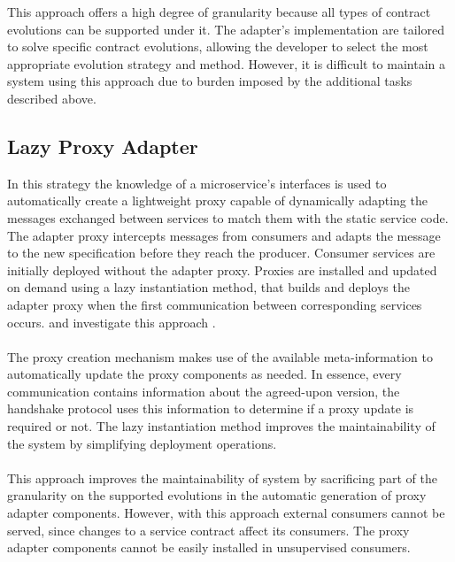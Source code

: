 This approach offers a high degree of granularity because all types of contract evolutions can be supported under it.
The adapter's implementation are tailored to solve specific contract evolutions, allowing the developer to select the most appropriate evolution strategy and method.
However, it is difficult to maintain a system using this approach due to burden imposed by the additional tasks described above.

\subsection{Lazy Proxy Adapter} %
\label{sec:proxy_adapter}

In this strategy the knowledge of a microservice’s
interfaces is used to automatically create a lightweight proxy capable of dynamically adapting the messages exchanged between services to match them with the static service code.
The adapter proxy intercepts messages from consumers and adapts the message to the new specification before they reach the producer.
Consumer services are initially deployed without the adapter proxy.
Proxies are installed and updated on demand using a lazy instantiation method, that builds and deploys the adapter proxy when the first communication between corresponding services occurs.
\citeauthor{seco2020robust} and \citeauthor{santosregent} investigate this approach \cite{seco2020robust, santosregent}.

\paragraph{}

The proxy creation mechanism makes use of the available meta-information
to automatically update the proxy components as needed.
In essence, every communication contains information about the agreed-upon version, the handshake protocol uses this information to determine if a proxy update is required or not.
The lazy instantiation method improves the maintainability of the system by
simplifying deployment operations.

\paragraph{}

This approach improves the maintainability of system by sacrificing part of the granularity on the supported evolutions in the automatic generation of proxy adapter components.
However, with this approach external consumers cannot be served, since changes to a service contract affect its consumers.
The proxy adapter components cannot be easily installed in unsupervised consumers.

